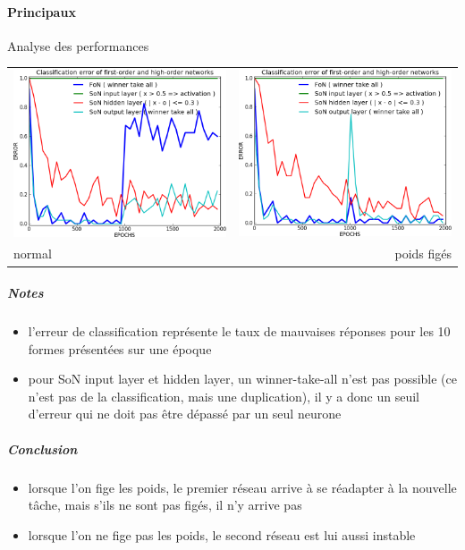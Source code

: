     \paragraph{Principaux}
      Analyse des performances
      \begin{center}
	\begin{tabular}{lr}
	  \hspace*{-1cm}
	  \includegraphics[width=250px]{data/expB5/err.png}
	  &
	  \includegraphics[width=250px]{data/expB5/err_block.png} \\
	  normal
	  &
	  poids figés
	\end{tabular}
      \end{center}
      \subparagraph{Notes}
	\begin{itemize}
	  \item l'erreur de classification représente le taux de mauvaises réponses pour les 10 formes présentées sur une époque
	  \item pour SoN input layer et hidden layer, un winner-take-all n'est pas possible (ce n'est pas de la classification, 
	  mais une duplication), il y a donc un seuil d'erreur qui ne doit pas être dépassé par un seul neurone
	\end{itemize}
      \subparagraph{Conclusion}
	\begin{itemize}
	  \item lorsque l'on fige les poids, le premier réseau arrive à se réadapter à la nouvelle tâche, mais s'ils ne sont
	  pas figés, il n'y arrive pas
	  \item lorsque l'on ne fige pas les poids, le second réseau est lui aussi instable
	  
	\end{itemize}
